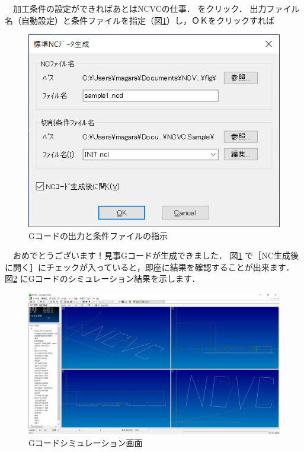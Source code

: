 \begin{minipage}[t]{0.5\textwidth}
　加工条件の設定ができればあとはNCVCの仕事．
 をクリック．
出力ファイル名（自動設定）と条件ファイルを指定（図\ref{fig:make.png}）し，ＯＫをクリックすれば
\end{minipage}
\begin{minipage}[t]{0.5\textwidth}
\vspace*{-2zh}
\begin{figure}[H]
\centering
\includegraphics[scale=0.7]{No2/fig/make.png}
\caption{Gコードの出力と条件ファイルの指示}
\label{fig:make.png}
\end{figure}
\end{minipage}

\vspace*{2zh}
　おめでとうございます！見事Gコードが生成できました．
図\ref{fig:make.png} で［NC生成後に開く］にチェックが入っていると，即座に結果を確認することが出来ます．
図\ref{fig:sim.png} にGコードのシミュレーション結果を示します．

\begin{figure}[H]
\centering
\includegraphics[scale=0.4]{No2/fig/sim.png}
\caption{Gコードシミュレーション画面}
\label{fig:sim.png}
\end{figure}

